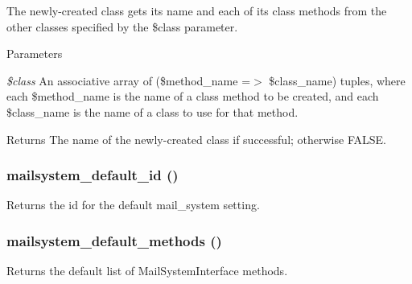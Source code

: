 The newly-\/created class gets its name and each of its class methods from the other classes specified by the \$class parameter.


\begin{DoxyParams}{Parameters}
\item[{\em \$class}]An associative array of (\$method\_\-name =$>$ \$class\_\-name) tuples, where each \$method\_\-name is the name of a class method to be created, and each \$class\_\-name is the name of a class to use for that method.\end{DoxyParams}
\begin{DoxyReturn}{Returns}
The name of the newly-\/created class if successful; otherwise FALSE. 
\end{DoxyReturn}
\hypertarget{mailsystem_8module_a6dc2bc890196d513049110b752b33cb5}{
\subsubsection[{mailsystem\_\-default\_\-id}]{\setlength{\rightskip}{0pt plus 5cm}mailsystem\_\-default\_\-id ()}}
\label{mailsystem_8module_a6dc2bc890196d513049110b752b33cb5}
Returns the id for the default mail\_\-system setting. \hypertarget{mailsystem_8module_a550d9fb0b029f862fbfdfc31670ca4da}{
\subsubsection[{mailsystem\_\-default\_\-methods}]{\setlength{\rightskip}{0pt plus 5cm}mailsystem\_\-default\_\-methods ()}}
\label{mailsystem_8module_a550d9fb0b029f862fbfdfc31670ca4da}
Returns the default list of MailSystemInterface methods.

